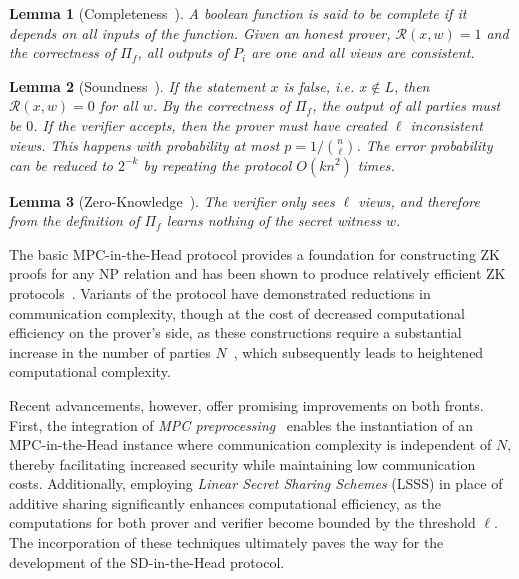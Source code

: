 \documentclass[twoside,11pt]{report}
\theoremstyle{definition}
\theoremstyle{plain}
\newtheorem{lemma}{Lemma}[section]
\begin{document}
\begin{lemma}[Completeness~\cite{ishai2007zero}]\label{def:mpcinth_completeness}
  A boolean function is said to be complete if it depends on all inputs of the function. Given an honest prover, $\mathcal{R}(x,w) = 1$ and the correctness of $\Pi_f$, all outputs of $P_i$ are one and all views are consistent.
\end{lemma}

\begin{lemma}[Soundness~\cite{ishai2007zero}]
  If the statement $x$ is false, i.e. $x \notin L$, then $\mathcal{R}(x,w) = 0$ for all $w$. By the correctness of $\Pi_f$, the output of all parties must be $0$. If the verifier accepts, then the prover must have created $\ell$ inconsistent views. This happens with probability at most $p = 1 / \binom{n}{\ell}$. The error probability can be reduced to $2^{-k}$ by repeating the protocol $O(kn^2)$ times.
\end{lemma}

\begin{lemma}[Zero-Knowledge~\cite{ishai2007zero}]
  The verifier only sees $\ell$ views, and therefore from the definition of $\Pi_f$ learns nothing of the secret witness $w$.
\end{lemma}

The basic MPC-in-the-Head protocol provides a foundation for constructing ZK proofs for any NP relation and has been shown to produce relatively efficient ZK protocols~\cite{feneuil2023threshold,baum2020concretely,katz2018improved}. Variants of the protocol have demonstrated reductions in communication complexity, though at the cost of decreased computational efficiency on the prover's side, as these constructions require a substantial increase in the number of parties $N$~\cite{ishai2007zero, feneuil2023threshold}, which subsequently leads to heightened computational complexity.

Recent advancements, however, offer promising improvements on both fronts. First, the integration of \textit{MPC preprocessing}~\cite{katz2018improved,baum2020concretely} enables the instantiation of an MPC-in-the-Head instance where communication complexity is independent of $N$, thereby facilitating increased security while maintaining low communication costs. Additionally, employing \textit{Linear Secret Sharing Schemes} (LSSS)\cite{feneuil2023threshold} in place of additive sharing significantly enhances computational efficiency, as the computations for both prover and verifier become bounded by the threshold $\ell$. The incorporation of these techniques ultimately paves the way for the development of the SD-in-the-Head protocol.
\end{document}
